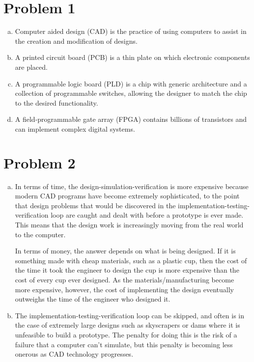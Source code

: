  

\section*{Problem 1}
	\begin{enumerate}[(a)]
	\item
		Computer aided design (CAD) is the practice of using computers to assist in 
		the creation and modification of designs.
		
	\item
		A printed circuit board (PCB) is a thin plate on which electronic components 		
		are placed.
		
	\item
		A programmable logic board (PLD) is a chip with generic architecture and a 
		collection of programmable switches, allowing the designer to match the chip 
		to the desired functionality.
		
	\item
		A field-programmable gate array (FPGA) contains billions of transistors and can 
		implement complex digital systems.
		
	\end{enumerate}
		
\section*{Problem 2}
	\begin{enumerate}[(a)]
	\item 
		In terms of time, the design-simulation-verification is more expensive because modern CAD programs have become extremely sophisticated, to the point that design problems that would be discovered in the implementation-testing-verification loop are caught and dealt with before a prototype is ever made. This means that the design work is increasingly moving from the real world to the computer.
		
		In terms of money, the answer depends on what is being designed. If it is something made with cheap materials, such as a plastic cup, then the cost of the time it took the engineer to design the cup is more expensive than the cost of every cup ever designed. As the materials/manufacturing become more expensive, however, the cost of implementing the design eventually outweighs the time of the engineer who designed it.
		
		\item The implementation-testing-verification loop can be skipped, and often is in the case of extremely large designs such as skyscrapers or dams where it is unfeasible to build a prototype. The penalty for doing this is the risk of a failure that a computer can't simulate, but this penalty is becoming less onerous as CAD technology progresses.

	\end{enumerate}


